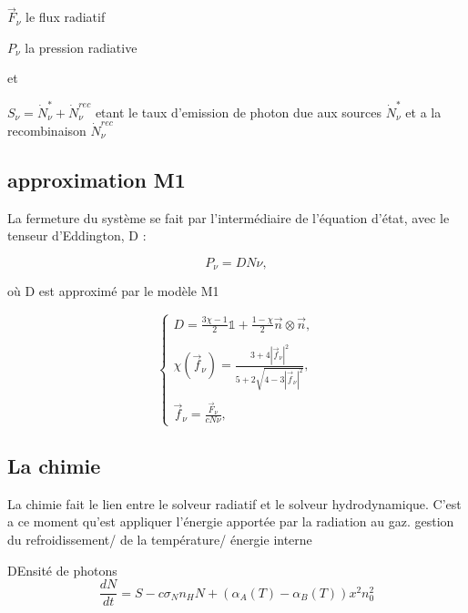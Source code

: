 $\vec{F}_\nu$ le flux radiatif

$P_\nu $ la pression radiative

et 

$S_\nu = \dot{N}_\nu^* + \dot{N}_\nu^{rec}$ etant le taux d'emission de photon due aux sources $\dot{N}_\nu^*$ et a la recombinaison $ \dot{N}_\nu^{rec}$


\subsection{approximation M1}
La fermeture du système se fait par l’intermédiaire de l’équation
d’état, avec le tenseur d’Eddington, D :

\begin{equation}
 P_\nu = D N\nu ,
\label{eq:fermeture}
\end{equation}

où D est approximé par le modèle M1 \citep{levermore1984}%

\begin{equation}
\begin{cases}

D = \frac{ 3\chi -1 }{2} \mathbb{1} + \frac{ 1 - \chi }{2} \vec{n} \otimes \vec{n} , \\
\\
\chi(\vec{f}_\nu) = \frac{ 3+4 |\vec{f}_\nu|^2 }{5+2\sqrt{4-3|\vec{f}_\nu|^2}} , \\
\\
\vec{f}_\nu = \frac{ \vec{F}_\nu }{c N\nu }  ,

\end{cases}
\label{eq:tenseur}
\end{equation}





\subsection{La chimie}

La chimie fait le lien entre le solveur radiatif et le solveur hydrodynamique.
C'est a ce moment qu'est appliquer l'énergie apportée par la radiation au gaz.
gestion du refroidissement/ de la température/ énergie interne

DEnsité de photons
\begin{equation}
\frac{dN}{dt} = S - c \sigma_N n_H N + \left( \alpha_A(T)  - \alpha_B(T) \right) x^2n_0^2
\end{equation}


